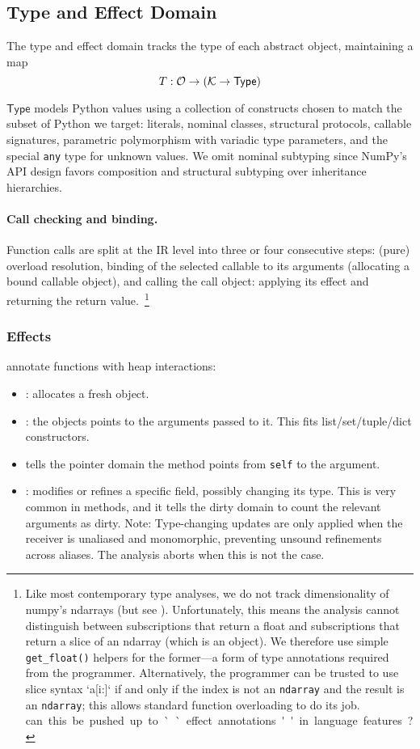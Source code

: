 \subsection{Type and Effect Domain}
\label{sec:type}

The type and effect domain tracks the type of each abstract object, maintaining a map \[T : \mathcal{O} \to (\mathcal{K} \to \mathsf{Type})\] 

$\mathsf{Type}$ models Python values using a collection of constructs chosen to match the subset of Python we target: literals, nominal classes, structural protocols, callable signatures, parametric polymorphism with variadic type parameters, and the special \texttt{any} type for unknown values. We omit nominal subtyping since NumPy's API design favors composition and structural subtyping over inheritance hierarchies.

\paragraph{Call checking and binding.}
Function calls are split at the IR level into three or four consecutive steps: (pure) overload resolution, binding of the selected callable to its arguments (allocating a bound callable object), and calling the call object: applying its effect and returning the return value.~\footnote{Like most contemporary type analyses, we do not track dimensionality of numpy's \textsf{ndarrays} (but see \cite{liu2020type}). Unfortunately, this means the analysis cannot distinguish between subscriptions that return a \textsf{float} and subscriptions that return a slice of an \textsf{ndarray} (which is an object). We therefore use simple \texttt{get\_float()} helpers for the former---a form of type annotations required from the programmer. Alternatively, the programmer can be trusted to use slice syntax `a[i:]` if and only if the index is not an \texttt{ndarray} and the result is an \texttt{ndarray}; this allows standard function overloading to do its job.   
\si{can this be pushed up to ``effect annotations'' in language features?}}

\subsubsection{Effects} annotate functions with heap interactions:
\begin{itemize}
  \item \tnew: allocates a fresh object.
  \item \tptstoargs: the \tnew objects points to the arguments passed to it. This fits list/set/tuple/dict constructors.
  \item \tboundmeth tells the pointer domain the method points from \texttt{self} to the argument.
  \item \tupdate: modifies or refines a specific field, possibly changing its type. This is very common in methods, and it tells the dirty domain to count the relevant arguments as dirty. Note: Type-changing updates are only applied when the receiver is unaliased and monomorphic, preventing unsound refinements across aliases. The analysis aborts when this is not the case.
\end{itemize}

